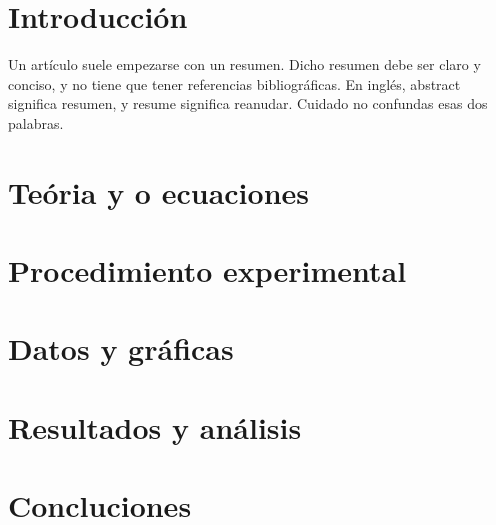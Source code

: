 \documentclass[10pt,a4paper]{article}
\begin{document}
\begin{multicols}{2}

\section{Introducción}  	
\label{sec1} %


Un artículo suele empezarse con un resumen. Dicho resumen debe ser claro y conciso, y no tiene que tener referencias bibliográficas. En inglés, abstract significa resumen, y resume significa reanudar. Cuidado no confundas esas dos palabras.

\section{Teória y o ecuaciones}
%
\label{sec2} 

\section{Procedimiento experimental}
%
\label{sec3} 

\section{Datos y gráficas}
%
\label{sec4} 

\section{Resultados y análisis}
%
\label{sec5} 

\section{Concluciones}
%
\label{sec6} 


\end{multicols}






\end{document}
